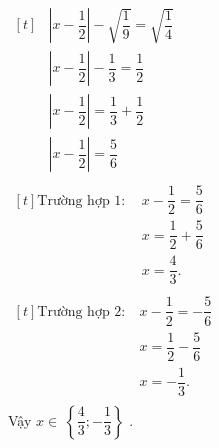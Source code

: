 \begin{ex}
{\begin{enumEX}{2}
				\item $\begin{aligned}[t]		
		    &\left|x - \dfrac{1}{2}\right|- \sqrt{\dfrac{1}{9}} = \sqrt{\dfrac{1}{4}}\\
			 &\left|x - \dfrac{1}{2}\right| - \dfrac{1}{3} = \dfrac{1}{2}\\
			 &\left|x - \dfrac{1}{2}\right| = \dfrac{1}{3} + \dfrac{1}{2}\\
			 &\left|x - \dfrac{1}{2}\right| = \dfrac{5}{6}\\
			 \end{aligned}$\\
			$\begin{aligned}[t]	
			 	\text{Trường hợp 1}: \
				&x - \dfrac{1}{2} = \dfrac{5}{6}\\
				&x = \dfrac{1}{2} + \dfrac{5}{6}\\
		      	&x = \dfrac{4}{3}.\\
			\end{aligned}$\\
			$\begin{aligned}[t]
				\text{Trường hợp 2:} \
				&x - \dfrac{1}{2} = -\dfrac{5}{6}\\
		        &x = \dfrac{1}{2} - \dfrac{5}{6}\\
	          	& x = -\dfrac{1}{3}.\\
           	\end{aligned}$\\
		 Vậy $x \in\ \left\lbrace  \dfrac{4}{3};-\dfrac{1}{3} \right\rbrace $
.			 			\end{enumEX}
		}
	\end{ex}
				
